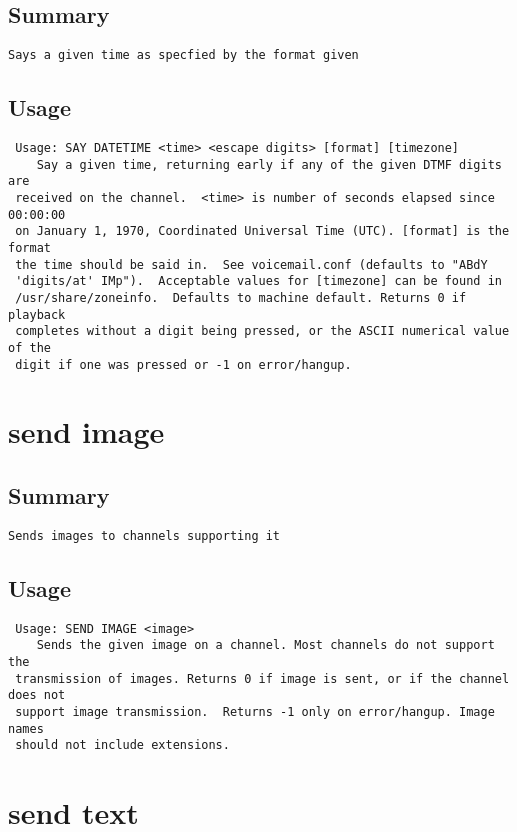 \subsection{Summary}
\begin{verbatim}
Says a given time as specfied by the format given
\end{verbatim}
\subsection{Usage}
\begin{verbatim}
 Usage: SAY DATETIME <time> <escape digits> [format] [timezone]
	Say a given time, returning early if any of the given DTMF digits are
 received on the channel.  <time> is number of seconds elapsed since 00:00:00
 on January 1, 1970, Coordinated Universal Time (UTC). [format] is the format
 the time should be said in.  See voicemail.conf (defaults to "ABdY
 'digits/at' IMp").  Acceptable values for [timezone] can be found in
 /usr/share/zoneinfo.  Defaults to machine default. Returns 0 if playback
 completes without a digit being pressed, or the ASCII numerical value of the
 digit if one was pressed or -1 on error/hangup.

\end{verbatim}


\section{send image}
\subsection{Summary}
\begin{verbatim}
Sends images to channels supporting it
\end{verbatim}
\subsection{Usage}
\begin{verbatim}
 Usage: SEND IMAGE <image>
	Sends the given image on a channel. Most channels do not support the
 transmission of images. Returns 0 if image is sent, or if the channel does not
 support image transmission.  Returns -1 only on error/hangup. Image names
 should not include extensions.

\end{verbatim}


\section{send text}
